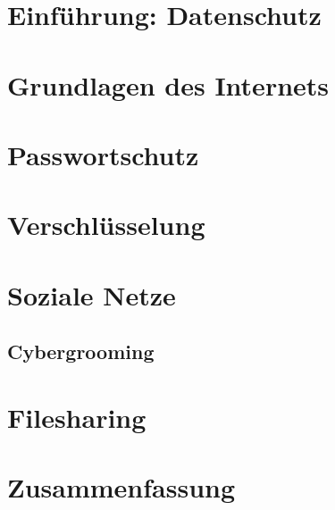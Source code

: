 \section{Einf\"uhrung: Datenschutz}

\section{Grundlagen des Internets}

\section{Passwortschutz}

\section{Verschl\"usselung}

\section{Soziale Netze}

\subsection{Cybergrooming}

\section{Filesharing}

\section{Zusammenfassung}

